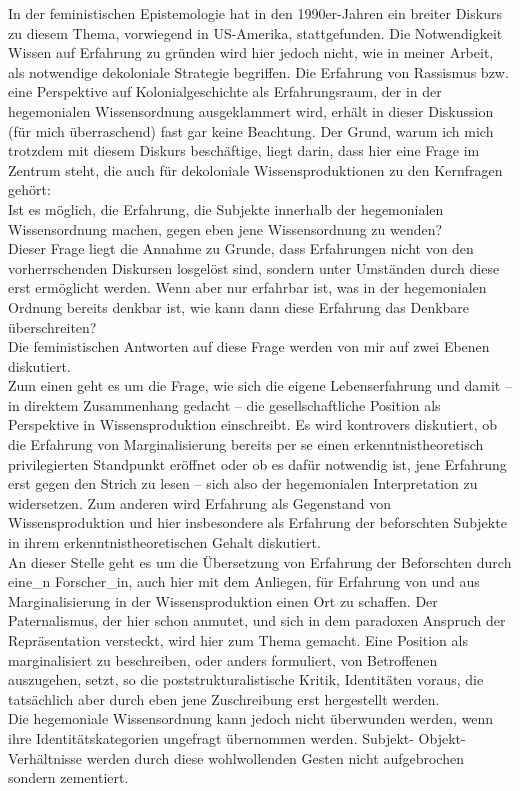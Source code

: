 \noindent In der feministischen Epistemologie hat in den 1990er-Jahren ein breiter Diskurs
zu diesem Thema, vorwiegend in US-Amerika, stattgefunden. Die Notwendigkeit
Wissen auf Erfahrung zu gründen wird hier jedoch nicht, wie in meiner Arbeit,
als notwendige dekoloniale Strategie begriffen. Die Erfahrung von Rassismus bzw.
eine Perspektive auf Kolonialgeschichte als Erfahrungsraum, der in der
hegemonialen Wissensordnung ausgeklammert wird, erhält in dieser Diskussion (für
mich überraschend) fast gar keine Beachtung. Der Grund, warum ich mich trotzdem
mit diesem Diskurs beschäftige, liegt darin, dass hier eine Frage im Zentrum
steht, die auch für dekoloniale Wissensproduktionen zu den Kernfragen gehört:\\
Ist es möglich, die Erfahrung, die Subjekte innerhalb der hegemonialen
Wissensordnung machen, gegen eben jene Wissensordnung zu wenden?\\
Dieser Frage
liegt die Annahme zu Grunde, dass Erfahrungen nicht von den vorherrschenden
Diskursen losgelöst sind, sondern unter Umständen durch diese erst ermöglicht
werden. Wenn aber nur erfahrbar ist, was in der hegemonialen Ordnung bereits
denkbar ist, wie kann dann diese Erfahrung das Denkbare überschreiten?\\

\noindent Die
feministischen Antworten auf diese Frage werden von mir auf zwei Ebenen
diskutiert. \\
Zum einen geht es um die Frage, wie sich die eigene Lebenserfahrung
und damit – in direktem Zusammenhang gedacht – die gesellschaftliche Position
als Perspektive in Wissensproduktion einschreibt. Es wird kontrovers diskutiert,
ob die Erfahrung von Marginalisierung bereits per se einen erkenntnistheoretisch
privilegierten Standpunkt eröffnet oder ob es dafür notwendig ist, jene
Erfahrung erst gegen den Strich zu lesen – sich also der hegemonialen
Interpretation zu widersetzen. Zum anderen wird Erfahrung als Gegenstand von
Wissensproduktion und hier insbesondere als Erfahrung der beforschten Subjekte
in ihrem erkenntnistheoretischen Gehalt diskutiert. \\
An dieser Stelle geht es um
die Übersetzung von Erfahrung der Beforschten durch eine\_n Forscher\_in, auch
hier mit dem Anliegen, für Erfahrung von und aus Marginalisierung in der
Wissensproduktion einen Ort zu schaffen. Der Paternalismus, der hier schon
anmutet, und sich in dem paradoxen Anspruch der Repräsentation versteckt, wird
hier zum Thema gemacht. Eine Position als marginalisiert zu beschreiben, oder
anders formuliert, von Betroffenen auszugehen, setzt, so die
poststrukturalistische Kritik, Identitäten voraus, die tatsächlich aber durch
eben jene Zuschreibung erst hergestellt werden. \\
Die hegemoniale Wissensordnung
kann jedoch nicht überwunden werden, wenn ihre Identitätskategorien ungefragt
übernommen werden. Subjekt- Objekt-Verhältnisse werden durch diese wohlwollenden
Gesten nicht aufgebrochen sondern zementiert.\\

